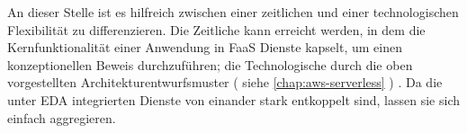 \documentclass[
12pt,
english,
ngerman,
headsepline,
twoside,
openright,
numbers=noenddot,version=first
]{scrreprt}
\begin{document}

An dieser Stelle ist es hilfreich zwischen einer zeitlichen und einer technologischen Flexibilität zu differenzieren. Die Zeitliche kann erreicht werden, in dem die Kernfunktionalität einer Anwendung in \acrshort{FaaS} Dienste kapselt, um einen konzeptionellen Beweis durchzuführen; die Technologische durch die oben vorgestellten Architekturentwurfsmuster ( siehe \autoref{chap:aws-serverless} ) . Da die unter \acrshort{EDA} integrierten Dienste von einander stark entkoppelt sind, lassen sie sich einfach aggregieren.




\lstlistoflistings

\listoftables



\end{document}
